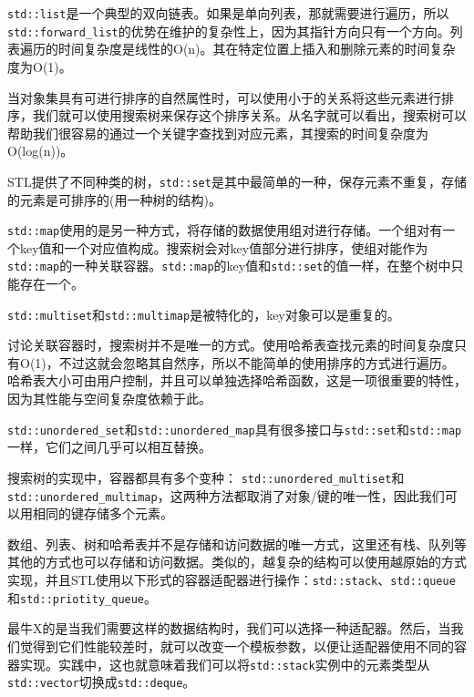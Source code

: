 
\texttt{std::list}是一个典型的双向链表。如果是单向列表，那就需要进行遍历，所以\texttt{std::forward\_list}的优势在维护的复杂性上，因为其指针方向只有一个方向。列表遍历的时间复杂度是线性的O(n)。其在特定位置上插入和删除元素的时间复杂度为O(1)。


当对象集具有可进行排序的自然属性时，可以使用小于的关系将这些元素进行排序，我们就可以使用搜索树来保存这个排序关系。从名字就可以看出，搜索树可以帮助我们很容易的通过一个关键字查找到对应元素，其搜索的时间复杂度为O(log(n))。

STL提供了不同种类的树，\texttt{std::set}是其中最简单的一种，保存元素不重复，存储的元素是可排序的(用一种树的结构)。

\texttt{std::map}使用的是另一种方式，将存储的数据使用组对进行存储。一个组对有一个key值和一个对应值构成。搜索树会对key值部分进行排序，使组对能作为\texttt{std::map}的一种关联容器。\texttt{std::map}的key值和\texttt{std::set}的值一样，在整个树中只能存在一个。

\texttt{std::multiset}和\texttt{std::multimap}是被特化的，key对象可以是重复的。


讨论关联容器时，搜索树并不是唯一的方式。使用哈希表查找元素的时间复杂度只有O(1)，不过这就会忽略其自然序，所以不能简单的使用排序的方式进行遍历。哈希表大小可由用户控制，并且可以单独选择哈希函数，这是一项很重要的特性，因为其性能与空间复杂度依赖于此。

\texttt{std::unordered\_set}和\texttt{std::unordered\_map}具有很多接口与\texttt{std::set}和\texttt{std::map}一样，它们之间几乎可以相互替换。

搜索树的实现中，容器都具有多个变种： \texttt{std::unordered\_multiset}和\texttt{std::unordered\_multimap}，这两种方法都取消了对象/键的唯一性，因此我们可以用相同的键存储多个元素。


数组、列表、树和哈希表并不是存储和访问数据的唯一方式，这里还有栈、队列等其他的方式也可以存储和访问数据。类似的，越复杂的结构可以使用越原始的方式实现，并且STL使用以下形式的容器适配器进行操作：\texttt{std::stack}、\texttt{std::queue}和\texttt{std::priotity\_queue}。

最牛X的是当我们需要这样的数据结构时，我们可以选择一种适配器。然后，当我们觉得到它们性能较差时，就可以改变一个模板参数，以便让适配器使用不同的容器实现。实践中，这也就意味着我们可以将\texttt{std::stack}实例中的元素类型从\texttt{std::vector}切换成\texttt{std::deque}。


